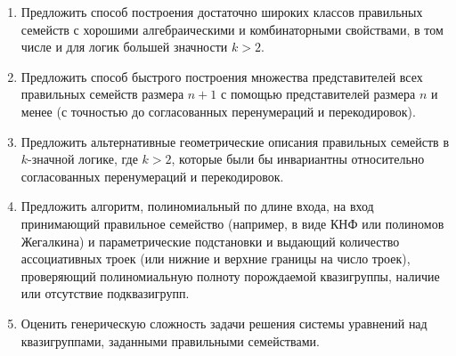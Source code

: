 \begin{enumerate}
  \item Предложить способ построения достаточно широких классов правильных семейств с хорошими алгебраическими и комбинаторными свойствами, в том числе и для логик большей значности $k > 2$.

  \item Предложить способ быстрого построения множества представителей всех правильных семейств размера $n+1$ с помощью представителей размера $n$ и менее (с точностью до согласованных перенумераций и перекодировок).

  \item Предложить альтернативные геометрические описания правильных семейств в $k$-значной логике, где $k>2$, которые были бы инвариантны относительно согласованных перенумераций и перекодировок.

  \item Предложить алгоритм, полиномиальный по длине входа, на вход принимающий правильное семейство (например, в виде КНФ или полиномов Жегалкина) и параметрические подстановки и выдающий количество ассоциативных троек (или нижние и верхние границы на число троек), проверяющий полиномиальную полноту порождаемой квазигруппы, наличие или отсутствие подквазигрупп.

  \item Оценить генерическую сложность задачи решения системы уравнений над квазигруппами, заданными правильными семействами.
\end{enumerate}
